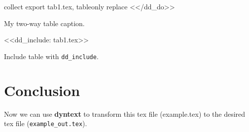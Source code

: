 \documentclass{ctexart}
\begin{document}
collect export tab1.tex, tableonly replace
<</dd_do>>
\fi


\begin{table}[H]
\centering
\caption{My two-way table caption.}
<<dd_include: tab1.tex>>
\caption{Include table with \texttt{dd\_include}.}
\end{table}

\section{Conclusion}
Now we can use \textbf{dyntext} to transform this tex file (example.tex) to 
the desired tex file (\texttt{example\_out.tex}).
\end{document}
